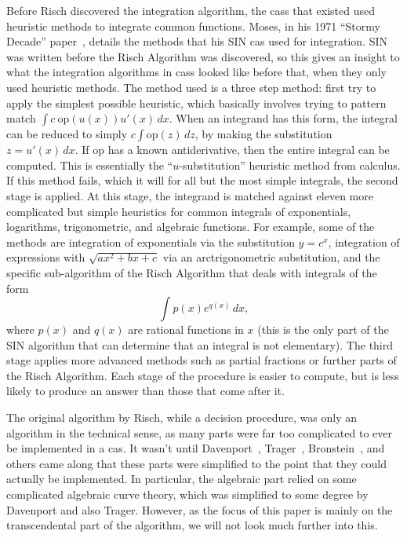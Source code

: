 Before Risch discovered the \gls{integration} algorithm, the \glspl{cas}
that existed used heuristic methods to integrate common functions.
Moses, in his 1971 ``Stormy Decade'' paper~\cite{moses1971symbolic},
details the methods that his SIN \gls{cas} used for \gls{integration}. SIN was
written before the Risch Algorithm was discovered, so this gives an
insight to what the \gls{integration} algorithms in \glspl{cas} looked like
before that, when they only used heuristic methods.  The method used is
a three step method: first try to apply the simplest possible heuristic,
which basically involves trying to pattern match $\int{c\
\mathrm{op}(u(x))u'(x)\,dx}$. When an \gls{integrand} has this form, the
integral can be reduced to simply $c\int{\mathrm{op}(z)\,dz}$, by making
the substitution $z=u'(x)\,dx$.  If $\mathrm{op}$ has a known
antiderivative, then the entire integral can be computed.  This is
essentially the ``$u$-substitution'' heuristic method from calculus.  If
this method fails, which it will for all but the most simple integrals,
the second stage is applied.  At this stage, the \gls{integrand} is
matched against eleven more complicated but simple heuristics for common
integrals of exponentials, logarithms, trigonometric, and
\gls{algebraic} functions.  For example, some of the methods are
\gls{integration} of exponentials via the substitution $y=c^x$,
\gls{integration} of expressions with $\sqrt{ax^2 + bx + c}$ via an
arctrigonometric substitution, and the specific sub-algorithm of the
Risch Algorithm that deals with integrals of the form
\begin{equation}
\label{SIN exponential form}
\int{p(x)e^{q(x)}\,dx},
\end{equation}
where $p(x)$ and $q(x)$ are \glspl{rational function} in $x$ (this is
the only part of the SIN algorithm that can determine that an integral
is not \gls{elementary}). The third stage applies more advanced methods
such as partial fractions or further parts of the Risch Algorithm.  Each
stage of the procedure is easier to compute, but is less likely to
produce an answer than those that come after it.

The original algorithm by Risch, while a decision procedure, was only an
algorithm in the technical sense, as many parts were far too complicated
to ever be implemented in a \gls{cas}.  It wasn't until
Davenport~\cite{davenport1984integration},
Trager~\cite{trager1984integration},
Bronstein~\cite{bronstein2005symbolic}, and others came along that these
parts were simplified to the point that they could actually be
implemented.  In particular, the \gls{algebraic} part relied on some
complicated \gls{algebraic} curve theory, which was simplified to some degree
by Davenport and also Trager.  However, as the focus of this paper is
mainly on the \gls{transcendental} part of the algorithm, we will not
look much further into this.  